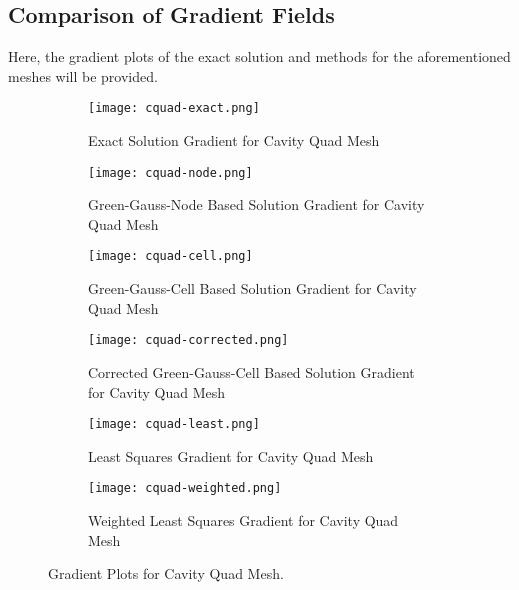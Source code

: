 \documentclass{article}
\begin{document}
\subsection{Comparison of Gradient Fields}
Here, the gradient plots of the exact solution and methods for the aforementioned meshes will be provided.
\begin{figure}[H]
  \centering
  \captionsetup{font=small}
  \begin{subfigure}{.45\textwidth}
    \centering
    \texttt{[image: cquad-exact.png]}
    \caption{Exact Solution Gradient for Cavity Quad Mesh}
    \label{fig:11}
  \end{subfigure}%
  \hfill
  \begin{subfigure}{.45\textwidth}
    \centering
    \texttt{[image: cquad-node.png]}
    \caption{Green-Gauss-Node Based Solution Gradient for Cavity Quad Mesh}
    \label{fig:12}
  \end{subfigure}

  \begin{subfigure}{.45\textwidth}
    \centering
    \texttt{[image: cquad-cell.png]}
    \caption{Green-Gauss-Cell Based Solution Gradient for Cavity Quad Mesh}
    \label{fig:13}
  \end{subfigure}%
  \hfill
  \begin{subfigure}{.45\textwidth}
    \centering
    \texttt{[image: cquad-corrected.png]}
    \caption{Corrected Green-Gauss-Cell Based Solution Gradient for Cavity Quad Mesh}
    \label{fig:14}
  \end{subfigure}

  \begin{subfigure}{.45\textwidth}
    \centering
    \texttt{[image: cquad-least.png]}
    \caption{Least Squares Gradient for Cavity Quad Mesh}
    \label{fig:15}
  \end{subfigure}%
  \hfill
  \begin{subfigure}{.45\textwidth}
    \centering
    \texttt{[image: cquad-weighted.png]}
    \caption{Weighted Least Squares Gradient for Cavity Quad Mesh}
    \label{fig:16}
  \end{subfigure}
  
  \caption{Gradient Plots for Cavity Quad Mesh.}
  \label{fig:1}
\end{figure}
\end{document}
